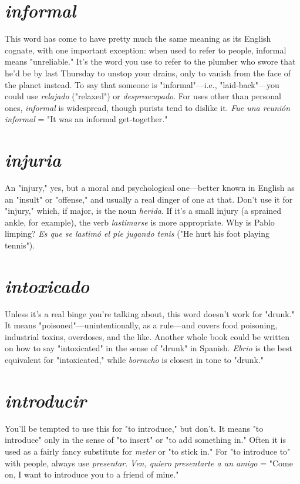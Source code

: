 \documentclass[14pt,a4paper,oneside]{memoir}
\begin{document}
\section{\emph{informal}}

This word has come to have pretty much the
same meaning as its English cognate, with one important exception:
when used to refer to people, informal means "unreliable." It's the
word you use to refer to the plumber who swore that he'd be by last
Thursday to unstop your drains, only to vanish from the face of the
planet instead. To say that someone is "informal"---i.e., "laid-back"---you could use \emph{relajado} ("relaxed") or \emph{despreocupado}. For uses other
than personal ones, \emph{informal} is widespread, though purists tend to dislike it. \emph{Fue una reunión informal} = "It was an informal get-together."

\section{\emph{injuria}}

An "injury," yes, but a moral and psychological
one---better known in English as an "insult" or "offense," and usually
a real dinger of one at that. Don't use it for "injury," which, if major, is
the noun \emph{herida}. If it's a small injury (a sprained ankle, for example),
the verb \emph{lastimarse} is more appropriate. Why is Pablo limping? \emph{Es que
se lastimó el pie jugando tenis} ("He hurt his foot playing tennis").

\section{\emph{intoxicado}}

Unless it's a real binge you're talking about,
this word doesn't work for "drunk." It means "poisoned"---unintentionally, as a rule---and covers food poisoning, industrial toxins, overdoses, and the like. Another whole book could be written on how to
say "intoxicated" in the sense of "drunk" in Spanish. \emph{Ebrio} is the
best equivalent for "intoxicated," while \emph{borracho} is closest in tone to "drunk."

\section{\emph{introducir}}

You'll be tempted to use this for "to introduce,"
but don't. It means "to introduce" only in the sense of "to insert" or
"to add something in." Often it is used as a fairly fancy substitute for
\emph{meter} or "to stick in." For "to introduce to" with people, always use
\emph{presentar}. \emph{Ven, quiero presentarte a un amigo} = "Come on, I want to
introduce you to a friend of mine."
\end{document}
